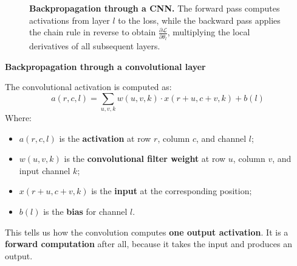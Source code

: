 \begin{figure}[!htp]
    \caption{\textbf{Backpropagation through a CNN.} The forward pass computes activations from layer $l$ to the loss, while the backward pass applies the chain rule in reverse to obtain $\frac{\partial \mathcal L}{\partial \theta_l}$, multiplying the local derivatives of all subsequent layers.}
\end{figure}

\highspace
\begin{flushleft}
    \textcolor{Green3}{ \textbf{Backpropagation through a convolutional layer}}
\end{flushleft}
The convolutional activation is computed as:
\begin{equation*}
    a(r,c,l) = \sum_{u,v,k} w(u,v,k) \cdot x(r+u,c+v,k) + b(l)
\end{equation*}
Where:
\begin{itemize}
    \item $a(r,c,l)$ is the \textbf{activation} at row $r$, column $c$, and channel $l$;
    \item $w(u,v,k)$ is the \textbf{convolutional filter weight} at row $u$, column $v$, and input channel $k$;
    \item $x(r+u,c+v,k)$ is the \textbf{input} at the corresponding position;
    \item $b(l)$ is the \textbf{bias} for channel $l$.
\end{itemize}
This tells us how the convolution computes \textbf{one output activation}. It is a \textbf{forward computation} after all, because it takes the input and produces an output.

